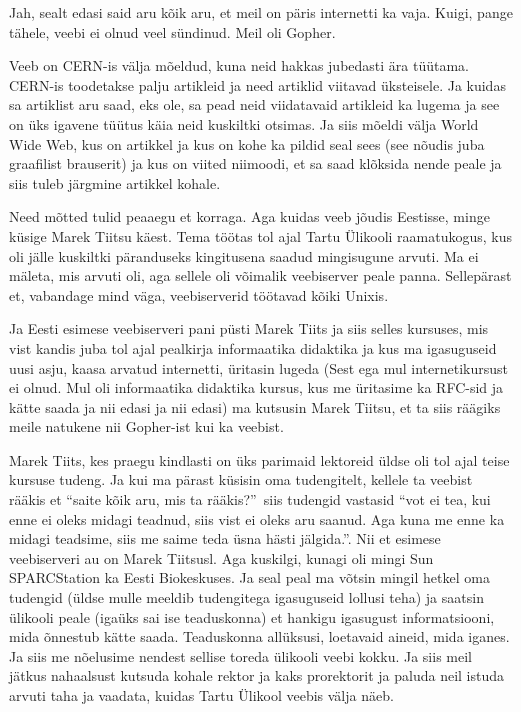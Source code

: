 
Jah, sealt edasi said aru kõik aru, et meil on päris internetti ka vaja. Kuigi, 
pange tähele, veebi ei olnud veel sündinud. Meil oli Gopher. 

Veeb on CERN-is välja mõeldud, kuna neid hakkas jubedasti ära tüütama.  CERN-is 
toodetakse palju artikleid ja need artiklid viitavad üksteisele. Ja kuidas sa 
artiklist aru saad, eks ole, sa pead neid viidatavaid artikleid ka lugema ja 
see on üks igavene tüütus käia neid kuskiltki otsimas. Ja siis mõeldi välja 
World Wide Web, kus on artikkel ja kus on kohe ka  pildid seal sees (see nõudis 
juba graafilist brauserit) ja kus on viited niimoodi, et sa saad klõksida nende 
peale ja siis tuleb järgmine artikkel kohale. 


Need mõtted tulid peaaegu et korraga. Aga kuidas veeb jõudis Eestisse, minge 
küsige Marek Tiitsu käest. Tema töötas tol ajal Tartu 
Ülikooli raamatukogus, kus oli jälle kuskiltki 
päranduseks kingitusena saadud mingisugune arvuti. Ma ei mäleta, mis arvuti 
oli, aga sellele oli  võimalik veebiserver peale panna. Sellepärast et, 
vabandage mind väga, veebiserverid töötavad kõiki Unixis. 

Ja Eesti esimese veebiserveri pani püsti Marek Tiits 
ja siis selles kursuses, mis vist kandis juba tol ajal pealkirja informaatika 
didaktika ja kus ma igasuguseid uusi asju, kaasa arvatud internetti, üritasin 
lugeda (Sest ega mul internetikursust ei olnud. Mul oli informaatika didaktika 
kursus, kus me üritasime ka RFC-sid ja kätte saada ja nii edasi ja nii edasi) 
ma kutsusin Marek Tiitsu, et ta siis räägiks meile natukene nii Gopher-ist kui 
ka veebist. 

Marek Tiits, kes praegu kindlasti on üks parimaid 
lektoreid üldse oli tol ajal teise kursuse tudeng. Ja kui ma pärast küsisin oma 
tudengitelt, kellele ta  veebist rääkis et \enquote{saite kõik aru, mis ta 
rääkis?} siis tudengid vastasid \enquote{vot ei tea, kui enne ei oleks midagi 
teadnud, siis vist ei oleks aru saanud. Aga kuna me enne ka midagi teadsime, 
siis me saime teda üsna hästi jälgida.}. Nii et esimese veebiserveri au on 
Marek Tiitsusl. Aga kuskilgi, kunagi oli mingi Sun SPARCStation  
ka Eesti Biokeskuses. Ja seal peal ma 
võtsin mingil hetkel oma tudengid (üldse mulle meeldib tudengitega igasuguseid 
lollusi teha) ja  saatsin ülikooli peale (igaüks sai ise teaduskonna) et 
hankigu igasugust informatsiooni, mida õnnestub kätte saada. Teaduskonna 
allüksusi, loetavaid aineid, mida iganes. Ja siis me nõelusime nendest sellise 
toreda ülikooli veebi kokku. Ja siis meil jätkus nahaalsust kutsuda kohale 
rektor ja kaks prorektorit ja paluda neil istuda arvuti taha ja vaadata, kuidas 
Tartu Ülikool veebis välja näeb. 

